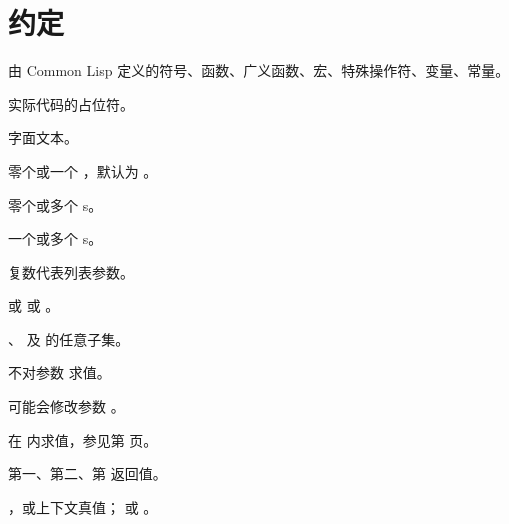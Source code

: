 %
%
\section*{约定}

\begin{LIST}{1cm}

  {
  由 Common Lisp 定义的符号、函数、广义函数、宏、特殊操作符、变量、常量。
  }

  {
  实际代码的占位符。
  }

  {
  字面文本。
  }

  {
  零个或一个 ，默认为 。
  }

  {
  零个或多个 s。
  }

  {
  一个或多个 s。
  }

  {
  复数代表列表参数。
  }

  {
   或  或 。
  }

  {
  、 及  的任意子集。
  }

  {
  不对参数  求值。
  }

  {
  可能会修改参数 。
  }

  {
   在  内求值，参见第 \pageref{:progn} 页。
  }

  {
  第一、第二、第  返回值。
  }

  \IT{\T; \NIL\qquad\qquad\qquad}
  {
  ，或上下文真值； 或 \kwd{()}。
  }
  
\end{LIST}

